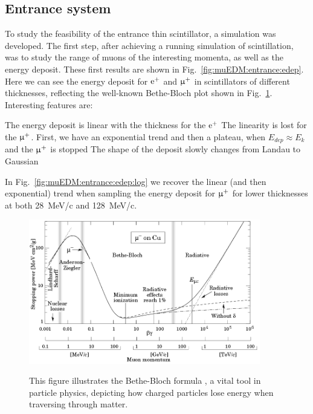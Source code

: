 \begin{refsection}
    \subsection{Entrance system}
        To study the feasibility of the entrance thin scintillator, a \gf simulation was developed.
        The first step, after achieving a running simulation of scintillation, was to study the range of muons of the interesting momenta, as well as the energy deposit. 
        These first results are shown in Fig.~\ref{fig:muEDM:entrance:edep}.
        Here we can see the energy deposit for $\text{e}^+$ and $\upmu^+$ in scintillators of different thicknesses, reflecting the well-known Bethe-Bloch plot shown in Fig.~\ref{fig:muEDM:entrance:BetheBloch}. 
        Interesting features are:
        \begin{outline}
            \1 The energy deposit is linear with the thickness for the $\text{e}^+$
            \1 The linearity is lost for the $\upmu^+$. First, we have an exponential trend and then a plateau, when $E_{dep}\approx E_k$ and the $\upmu^+$ is stopped
            \1 The shape of the deposit slowly changes from Landau to Gaussian
        \end{outline}
        In Fig.~\ref{fig:muEDM:entrance:edep:log} we recover the linear (and then exponential) trend when sampling the energy deposit for $\upmu^+$ for lower thicknesses at both \SI{28}{MeV/c} and \SI{128}{MeV/c}.


        \begin{figure}
            \centering
            \includegraphics[width=0.9\textwidth]{Figures/muEDM/Entrance/BetheBloch.png}\\
            \caption{This figure illustrates the Bethe-Bloch formula \cite{PDG}, a vital tool in particle physics, depicting how charged particles lose energy when traversing through matter.}
            \label{fig:muEDM:entrance:BetheBloch}
        \end{figure}
        

\end{refsection}
